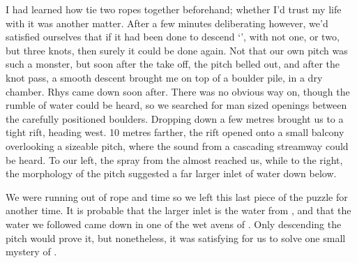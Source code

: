     I had learned how tie two ropes together beforehand; whether I'd trust my life with it was another matter. After a few minutes deliberating however, we'd satisfied ourselves that if it had been done to descend `', with not one, or two, but three knots, then surely it could be done again. Not that our own pitch was such a monster, but soon after the take off, the pitch belled out, and after the knot pass, a smooth descent brought me on top of a boulder pile, in a dry chamber. Rhys came down soon after. There was no obvious way on, though the rumble of water could be heard, so we searched for man sized openings between the carefully positioned boulders. Dropping down a few metres brought us to a tight rift, heading west. 10 metres farther, the rift opened onto a small balcony overlooking a sizeable pitch, where the sound from a cascading streamway could be heard. To our left, the spray from the  almost reached us, while to the right, the morphology of the pitch suggested a far larger inlet of water down below.






    We were running out of rope and time so we left this last piece of the puzzle for another time. It is probable that the larger inlet is the water from , and that the water we followed came down in one of the wet avens of . Only descending the pitch would prove it, but nonetheless, it was satisfying for us to solve one small mystery of . 
